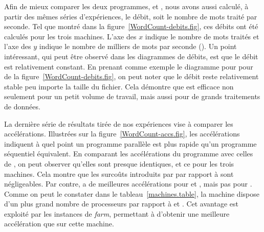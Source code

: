 Afin de mieux comparer les deux programmes,  et , nous avons aussi calculé, à partir des mêmes séries d'exp\'eriences, le d\'ebit, soit le nombre de mots trait\'e par seconde. Tel que montr\'e dans la figure~\ref{WordCount-debits.fig}, ces débits ont \'et\'e calculés pour les trois machines. L'axe des $x$ indique le nombre de mots trait\'es et l'axe des $y$ indique le nombre de milliers de mots par seconde (). Un point int\'eressant, qui peut \^etre observ\'e dans les diagrammes de d\'ebits, est que le d\'ebit est relativement constant. En prenant comme exemple le diagramme pour  pour  de la figure~\ref{WordCount-debits.fig}, on peut noter que le d\'ebit reste relativement stable peu importe la taille du fichier. Cela d\'emontre que  est efficace non seulement pour un petit volume de travail, mais aussi pour de grands traitements de donn\'ees.


La derni\`ere s\'erie de résultats tirée de nos exp\'eriences vise \`a comparer les acc\'el\'erations. Illustr\'ees sur la figure~\ref{WordCount-accs.fig}, les acc\'el\'erations indiquent \`a quel point un programme parall\`ele est plus rapide qu'un programme s\'equentiel \'equivalent. En comparant les acc\'el\'erations du programme  avec celles de , on peut observer qu'elles sont presque identiques, et ce pour les trois machines. Cela montre que les surco\^uts introduits par  par rapport \`a  sont n\'egligeables. Par contre,  a de meilleures acc\'el\'erations pour  et , mais pas pour . Comme on peut le constater dans le tableau~\ref{machines.table}, la machine  dispose d'un plus grand nombre de processeurs par rapport \`a  et . Cet avantage est exploit\'e par les instances de \emph{farm}, permettant \`a  d'obtenir une meilleure acc\'el\'eration que  sur cette machine.





